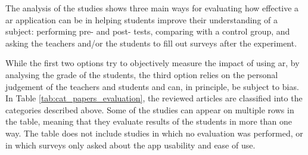 The analysis of the studies shows three main ways for evaluating how effective a \gls{ar} application can be in helping students improve their understanding of a subject: performing pre- and post- tests, comparing with a control group, and asking the teachers and/or the students to fill out surveys after the experiment.

\begin{figure}[htb!]	
	\begin{center}
	
    \captionsetup{font=small}
	\caption{\fontsize{10pt}{11pt}}
	\label{fig:testers}
    \end{center}
\end{figure}

While the first two options try to objectively measure the impact of using \gls{ar}, by analysing the grade of the students, the third option relies on the personal judgement of the teachers and students and can, in principle, be subject to bias.
In Table \ref{tab:cat_papers_evaluation}, the \papersSelected reviewed articles are classified into the categories described above. Some of the studies can appear on multiple rows in the table, meaning that they evaluate results of the students in more than one way. The table does not include studies in which no evaluation was performed, or in which surveys only asked about the app usability and ease of use.


